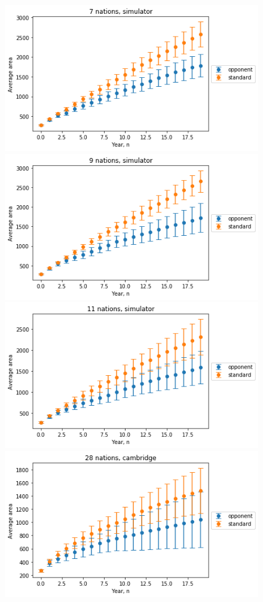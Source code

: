 \documentclass[conference]{IEEEtran}
\begin{document}
\begin{figure}[htbp]
\begin{center}
\includegraphics[width=0.95\columnwidth]{figures/results_7.png}
\includegraphics[width=0.95\columnwidth]{figures/results_9.png}
\includegraphics[width=0.95\columnwidth]{figures/results_11.png}
\includegraphics[width=0.95\columnwidth]{figures/results_cambridge.png}

\end{center}
\end{figure}
\end{document}
